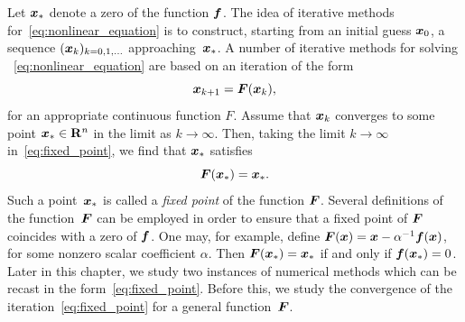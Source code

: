 Let $\mathbf{\boldsymbol{x}}_*$ denote a zero of the function $\mathbf{\boldsymbol{f}}$.
The idea of iterative methods for~\eqref{eq:nonlinear_equation} is to construct,
starting from an initial guess $\mathbf{\boldsymbol{x}}_0$,
a sequence $(\mathbf{\boldsymbol{x}}_k)_{k=0, 1, \dotsc}$ approaching~$\mathbf{\boldsymbol{x}}_*$.
A number of iterative methods for solving ~\eqref{eq:nonlinear_equation} are based on an iteration of the form
\begin{equation}
    \label{eq:fixed_point}
    \mathbf{\boldsymbol{x}}_{k+1} = \mathbf{\boldsymbol{F}}(\mathbf{\boldsymbol{x}}_{k}),
\end{equation}
for an appropriate continuous function $F$.
Assume that $\mathbf{\boldsymbol{x}}_k$ converges to some point $\mathbf{\boldsymbol{x}}_* \in \mathbf R^n$ in the limit as $k \to \infty$.
Then, taking the limit $k \to \infty$ in~\eqref{eq:fixed_point},
we find that $\mathbf{\boldsymbol{x}}_*$ satisfies
\[
    \mathbf{\boldsymbol{F}}(\mathbf{\boldsymbol{x}}_*) = \mathbf{\boldsymbol{x}}_*.
\]
Such a point~$\mathbf{\boldsymbol{x}}_*$ is called a \emph{fixed point} of the function $\mathbf{\boldsymbol{F}}$.
Several definitions of the function~$\mathbf{\boldsymbol{F}}$ can be employed in order to ensure that
a fixed point of $\mathbf{\boldsymbol{F}}$ coincides with a zero of $\mathbf{\boldsymbol{f}}$.
One may, for example, define $\mathbf{\boldsymbol{F}}(\mathbf{\boldsymbol{x}}) = \mathbf{\boldsymbol{x}} - \alpha^{-1} \mathbf{\boldsymbol{f}}(\mathbf{\boldsymbol{x}})$,
for some nonzero scalar coefficient $\alpha$.
Then $\mathbf{\boldsymbol{F}}(\mathbf{\boldsymbol{x}}_*) = \mathbf{\boldsymbol{x}}_*$ if and only if $\mathbf{\boldsymbol{f}}(\mathbf{\boldsymbol{x}}_*) = 0$.
Later in this chapter,
we study two instances of numerical methods which can be recast in the form~\eqref{eq:fixed_point}.
Before this,
we study the convergence of the iteration~\eqref{eq:fixed_point} for a general function~$\mathbf{\boldsymbol{F}}$.

